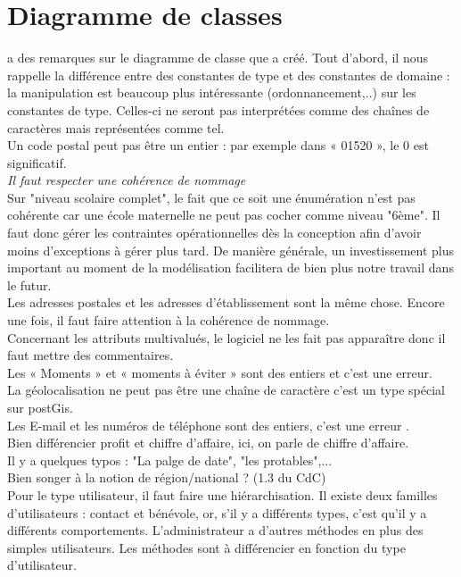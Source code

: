 \documentclass [a4paper] {article}
\begin{document}
\section{Diagramme de classes}
\nomTuteurPedago{} a des remarques sur le diagramme de classe que \Julie{} a créé. Tout d'abord, il nous rappelle la différence entre des constantes de type et des constantes de domaine : la manipulation est beaucoup plus intéressante (ordonnancement,..) sur les constantes de type. Celles-ci ne seront pas interprétées comme des chaînes de caractères mais représentées comme tel. \\
Un code postal peut pas être un entier : par exemple dans « 01520 », le 0 est significatif. \\
\emph{Il faut respecter une cohérence de nommage} \\
Sur "niveau scolaire complet", le fait que ce soit une énumération n'est pas cohérente car une école maternelle ne peut pas cocher comme niveau "6ème". Il faut donc gérer les contraintes opérationnelles dès la conception afin d'avoir moins d'exceptions à gérer plus tard. De manière générale, un investissement plus important au moment de la modélisation facilitera de bien plus notre travail dans le futur. \\
Les adresses postales et les adresses d’établissement sont la même chose. Encore une fois, il faut faire attention à la cohérence de nommage.\\
Concernant les attributs multivalués, le logiciel ne les fait pas apparaître donc il faut mettre des commentaires.\\
Les « Moments » et « moments à éviter » sont des entiers et c'est une erreur. \\
La géolocalisation ne peut pas être une chaîne de caractère c'est un type spécial sur postGis.\\
Les E-mail et les numéros de téléphone sont des entiers, c'est une erreur .\\
Bien différencier profit et chiffre d'affaire, ici, on parle de chiffre d'affaire.\\
Il y a quelques typos : "La palge de date", "les protables",...\\
Bien songer à la notion de région/national ? (1.3 du CdC) \\
Pour le type utilisateur, il faut faire une hiérarchisation. Il existe deux familles d'utilisateurs : contact et bénévole, or, s'il y a différents types, c'est qu'il y a différents comportements. L'administrateur a d'autres méthodes en plus des simples utilisateurs. Les méthodes sont à différencier en fonction du type d'utilisateur.\\
\end{document}
